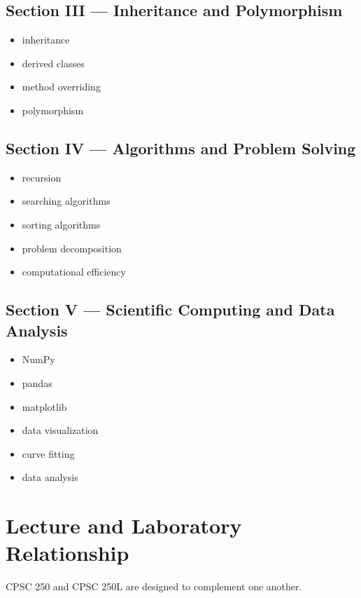 \documentclass[11pt]{article}
\begin{document}
\subsection*{\color{oopBlue}Section III --- Inheritance and Polymorphism}

\begin{itemize}
    \item inheritance
    \item derived classes
    \item method overriding
    \item polymorphism
\end{itemize}

\subsection*{\color{algoOrange}Section IV --- Algorithms and Problem Solving}

\begin{itemize}
    \item recursion
    \item searching algorithms
    \item sorting algorithms
    \item problem decomposition
    \item computational efficiency
\end{itemize}

\subsection*{\color{dataPurple}Section V --- Scientific Computing and Data Analysis}

\begin{itemize}
    \item NumPy
    \item pandas
    \item matplotlib
    \item data visualization
    \item curve fitting
    \item data analysis
\end{itemize}

\section{Lecture and Laboratory Relationship}

CPSC 250 and CPSC 250L are designed to complement one another.
\end{document}
